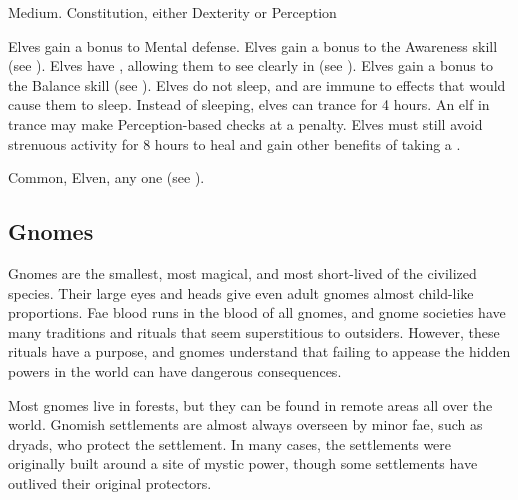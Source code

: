          Medium.
          Constitution, either  Dexterity or  Perception
        \begin{raggeditemize}
             Elves gain a  bonus to Mental defense.
             Elves gain a  bonus to the Awareness skill (see ).
             Elves have , allowing them to see clearly in  (see ).
             Elves gain a  bonus to the Balance skill (see ).
             Elves do not sleep, and are immune to  effects that would cause them to sleep.
                Instead of sleeping, elves can trance for 4 hours.
                An elf in trance may make Perception-based checks at a  penalty.
                Elves must still avoid strenuous activity for 8 hours to heal and gain other benefits of taking a .
        \end{raggeditemize}
         Common, Elven, any one  (see ).

    \subsection{Gnomes}

        Gnomes are the smallest, most magical, and most short-lived of the civilized species.
        Their large eyes and heads give even adult gnomes almost child-like proportions.
        Fae blood runs in the blood of all gnomes, and gnome societies have many traditions and rituals that seem superstitious to outsiders.
        However, these rituals have a purpose, and gnomes understand that failing to appease the hidden powers in the world can have dangerous consequences.

        Most gnomes live in forests, but they can be found in remote areas all over the world.
        Gnomish settlements are almost always overseen by minor fae, such as dryads, who protect the settlement.
        In many cases, the settlements were originally built around a site of mystic power, though some settlements have outlived their original protectors.

